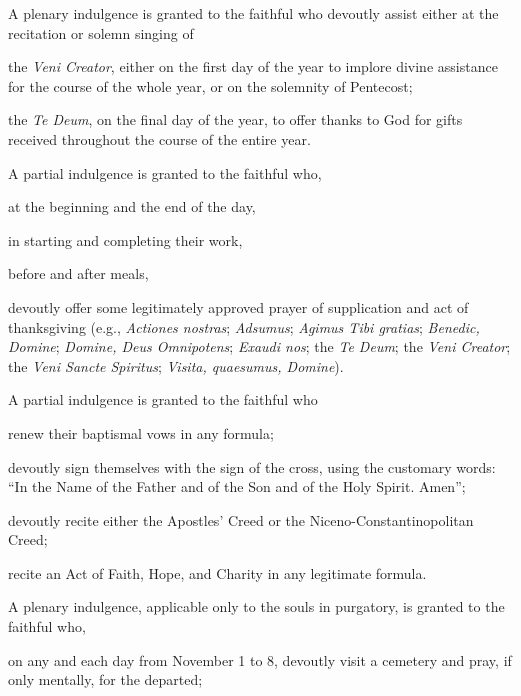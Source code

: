 \documentclass[12pt]{article}
\newcommand{\emphasis}[1]{\emph{#1}}
\newcommand{\emphasis}[1]{\textsl{#1}}
\newcommand{\foreign}[1]{\emphasis{#1}}
\begin{document}
\hypertarget{grant26}{}
 A plenary indulgence is granted to the faithful who devoutly assist either at the recitation or solemn singing of

 the \foreign{Veni Creator}, either on the first day of the year to implore divine assistance for the course of the whole year, or on the solemnity of Pentecost;

 the \foreign{Te Deum}, on the final day of the year, to offer thanks to God for gifts received throughout the course of the entire year.

 A partial indulgence is granted to the faithful who,

 at the beginning and the end of the day,

 in starting and completing their work,

 before and after meals,

devoutly offer some legitimately approved prayer of supplication and act of thanksgiving (e.g., \foreign{Actiones nostras}; \foreign{Adsumus}; \foreign{Agimus Tibi gratias}; \foreign{Benedic, Domine}; \foreign{Domine, Deus Omnipotens}; \foreign{Exaudi nos}; the \foreign{Te Deum}; the \foreign{Veni Creator}; the \foreign{Veni Sancte Spiritus}; \foreign{Visita, quaesumus, Domine}).

\hypertarget{grant28}{}
 A partial indulgence is granted to the faithful who

 renew their baptismal vows in any formula;

 devoutly sign themselves with the sign of the cross, using the customary words: ``In the Name of the Father and of the Son and of the Holy Spirit. Amen'';

 devoutly recite either the Apostles' Creed or the Niceno-Constantinopolitan Creed;

 recite an Act of Faith, Hope, and Charity in any legitimate formula.

\hypertarget{grant29}{}
 A plenary indulgence, applicable only to the souls in purgatory, is granted to the faithful who,

 on any and each day from November 1 to 8, devoutly visit a cemetery and pray, if only mentally, for the departed;
\end{document}
